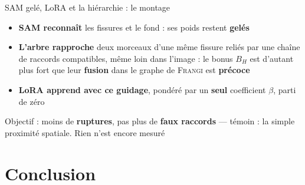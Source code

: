 \begin{frame}[t]{SAM gelé, LoRA et la hiérarchie : le montage}
    \vspace{-0.08cm}
    \begin{center}
        \resizebox{0.61\textwidth}{!}{}
    \end{center}

    \vspace{0.06cm}
    \small
    \begin{itemize}
        \setlength{\itemsep}{5pt}
        \item \textbf{SAM reconnaît} les fissures et le fond : ses poids restent \textbf{gelés} 
        \item \textbf{L'arbre rapproche} deux morceaux d'une même fissure reliés par une chaîne de
        raccords compatibles, même loin dans l'image : le bonus $B_H$ est d'autant plus fort que leur
        \textbf{fusion} dans le graphe de \textsc{Frangi} est \textbf{précoce}  
        \item \textbf{LoRA apprend avec ce guidage}, pondéré par un \textbf{seul} coefficient $\beta$,
        parti de zéro 
    \end{itemize}

    \vspace{0.04cm}
    \begin{center}
        {\footnotesize Objectif : moins de \textbf{ruptures}, pas plus de \textbf{faux raccords} ---
        témoin : la simple proximité spatiale. {\color{inria-rouge}Rien n'est encore mesuré}}
    \end{center}
\end{frame}

\section{Conclusion}
\begin{frame}[label=bk-conclusion]
    \sectionpage
\end{frame}


